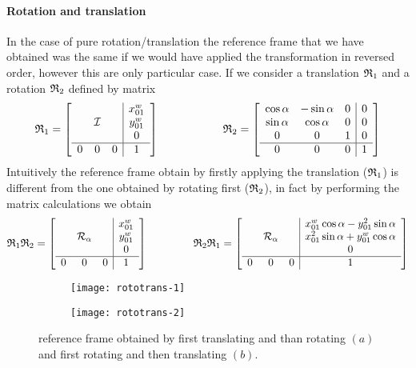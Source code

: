 		\paragraph{Rotation and translation} In the case of pure rotation/translation the reference frame that we have obtained was the same if we would have applied the transformation in reversed order, however this are only particular case. If we consider a translation $\mathfrak {R}_{1}$ and a rotation $\mathfrak {R}_{2}$ defined by matrix
		\[  \mathfrak {R}_{1} = \begin{bmatrix}  \begin{array}{c c c | c}  &&& x_{01}^w \\ & \mathcal I&& y_{01}^w \\ &&& 0 \\ \hline 0 & 0 & 0 & 1  \end{array} \end{bmatrix}  \hspace{2cm} \mathfrak {R}_{2} = \begin{bmatrix}  \begin{array}{c c c | c} \cos \alpha & -\sin \alpha & 0 & 0 \\ \sin\alpha & \cos \alpha & 0 & 0 \\ 0 & 0 & 1 & 0 \\ \hline 0 & 0 & 0 & 1 \end{array} \end{bmatrix} \]
		Intuitively the reference frame obtain by firstly applying the translation ($\mathfrak {R}_{1}$) is different from the one obtained by rotating first ($\mathfrak {R}_{2}$), in fact by performing the matrix calculations we obtain
		\[ \mathfrak {R}_{1} \mathfrak {R}_{2} = \begin{bmatrix}  \begin{array}{c c c | c}  &&& x_{01}^w \\ &\mathcal R_\alpha && y_{01}^w \\ &&& 0 \\ \hline 0&0&0& 1 \end{array} \end{bmatrix} \hspace{1.5cm} \mathfrak {R}_{2} \mathfrak {R}_{1}  = \begin{bmatrix}  \begin{array}{c c c | c}  &&& x_{01}^w \cos\alpha  - y_{01}^2 \sin\alpha \\ &\mathcal R_\alpha && x_{01}^2 \sin\alpha + y_{01}^w \cos\alpha \\ &&& 0 \\ \hline 0&0&0& 1 \end{array} \end{bmatrix}  \]
		
		
		\begin{figure}[bht]
			\centering 
			\begin{subfigure}{0.48\linewidth}
				\centering \texttt{[image: rototrans-1]} \caption{}
			\end{subfigure}
			\begin{subfigure}{0.48\linewidth}
				\centering \texttt{[image: rototrans-2]} \caption{}
			\end{subfigure}
			\caption{reference frame obtained by first translating and than rotating $(a)$ and first rotating and then translating $(b)$.} \label{fig:kin:transforder}
		\end{figure}
	
	
	
	
	
	
	
	
	
	
	